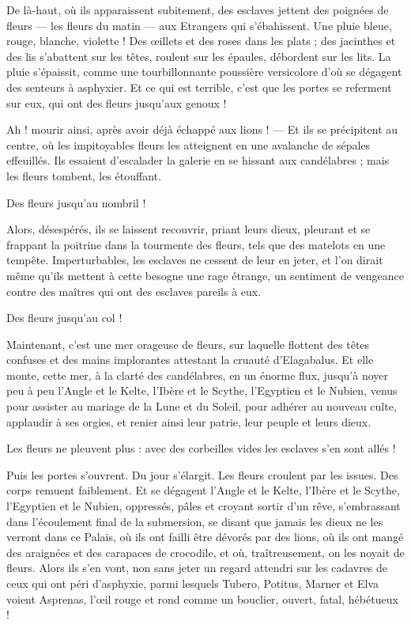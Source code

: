 \documentclass[a4paper, 11pt, oneside, polutonikogreek, french]{article}
\begin{document}
De là-haut, où ils apparaissent subitement, des esclaves jettent des poignées de fleurs --- les fleurs du matin --- aux Etrangers qui s'ébahissent. Une pluie bleue, rouge, blanche, violette ! Des œillets et des roses dans les plats ; des jacinthes et des lis s'abattent sur les têtes, roulent sur les épaules, débordent sur les lits. La pluie s'épaissit, comme une tourbillonnante poussière versicolore d'où se dégagent des senteurs à asphyxier. Et ce qui est terrible, c'est que les portes se referment sur eux, qui ont des fleurs jusqu'aux genoux !

Ah ! mourir ainsi, après avoir déjà échappé aux lions ! --- Et ils se précipitent au centre, où les impitoyables fleurs les atteignent en une avalanche de sépales effeuillés. Ils essaient d'escalader la galerie en se hissant aux candélabres ; mais les fleurs tombent, les étouffant.

Des fleurs jusqu'au nombril !

Alors, désespérés, ils se laissent recouvrir, priant leurs dieux, pleurant et se frappant la poitrine dans la tourmente des fleurs, tels que des matelots en une tempête. Imperturbables, les esclaves ne cessent de leur en jeter, et l'on dirait même qu'ils mettent à cette besogne une rage étrange, un sentiment de vengeance contre des maîtres qui ont des esclaves pareils à eux.

Des fleurs jusqu'au col !

Maintenant, c'est une mer orageuse de fleurs, sur laquelle flottent des têtes confuses et des mains implorantes attestant la cruauté d'Elagabalus. Et elle monte, cette mer, à la clarté des candélabres, en un énorme flux, jusqu'à noyer peu à peu l'Angle et le Kelte, l'Ibère et le Scythe, l'Egyptien et le Nubien, venus pour assister au mariage de la Lune et du Soleil, pour adhérer au nouveau culte, applaudir à ses orgies, et renier ainsi leur patrie, leur peuple et leurs dieux.

Les fleurs ne pleuvent plus : avec des corbeilles vides les esclaves s'en sont allés !

Puis les portes s'ouvrent. Du jour s'élargit. Les fleurs croulent par les issues. Des corps remuent faiblement. Et se dégagent l'Angle et le Kelte, l'Ibère et le Scythe, l'Egyptien et le Nubien, oppressés, pâles et croyant sortir d'un rêve, s'embrassant dans l'écoulement final de la submersion, se disant que jamais les dieux ne les verront dans ce Palais, où ils ont failli être dévorés par des lions, où ils ont mangé des araignées et des carapaces de crocodile, et où, traîtreusement, on les noyait de fleurs. Alors ils s'en vont, non sans jeter un regard attendri sur les cadavres de ceux qui ont péri d'asphyxie, parmi lesquels Tubero, Potitus, Marner et Elva voient Asprenas, l'œil rouge et rond comme un bouclier, ouvert, fatal, hébétueux !
\clearpage
\end{document}
